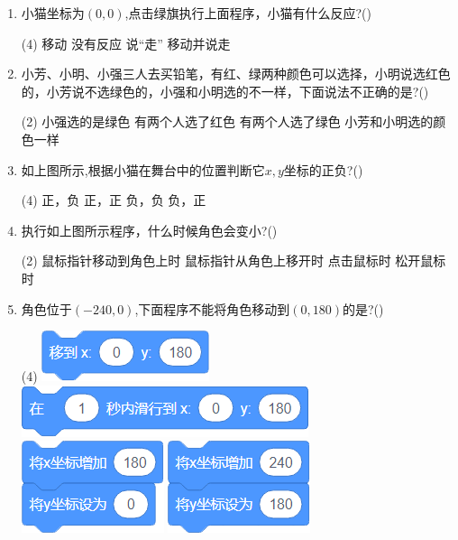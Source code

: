 \documentclass[10pt, a4paper]{article}
\begin{document}
\begin{enumerate}
        \item 小猫坐标为$(0,0)$,点击绿旗执行上面程序，小猫有什么反应?(\qquad)
        \begin{tasks}(4)
            \task 移动
            \task 没有反应
            \task 说“走”
            \task 移动并说走
        \end{tasks}

        \item 小芳、小明、小强三人去买铅笔，有红、绿两种颜色可以选择，小明说选红色的，小芳说不选绿色的，小强和小明选的不一样，下面说法不正确的是?(\qquad)
        \begin{tasks}(2)
            \task 小强选的是绿色
            \task 有两个人选了红色
            \task 有两个人选了绿色
            \task 小芳和小明选的颜色一样
        \end{tasks}

        \item 如上图所示,根据小猫在舞台中的位置判断它$x,y$坐标的正负?(\qquad)
        \begin{tasks}(4)
            \task 正，负
            \task 正，正
            \task 负，负
            \task 负，正
        \end{tasks}

        \item 执行如上图所示程序，什么时候角色会变小?(\qquad)
        \begin{tasks}(2)
            \task 鼠标指针移动到角色上时
            \task 鼠标指针从角色上移开时
            \task 点击鼠标时
            \task 松开鼠标时
        \end{tasks}

        \newpage
        \item 角色位于$(-240,0)$,下面程序不能将角色移动到$(0,180)$的是?(\qquad)
        \begin{tasks}(4)
            \task \includegraphics[width=.1\textwidth]{23a.png}
            \task \includegraphics[width=.18\textwidth]{23b.png}
            \task \includegraphics[width=.1\textwidth]{23c.png}
            \task \includegraphics[width=.1\textwidth]{23d.png}
        \end{tasks}


\end{enumerate}
\end{document}
